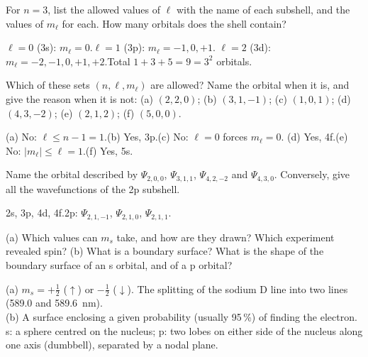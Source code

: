 
For $n = 3$, list the allowed values of $\ell$ with the name of each subshell, and the values of
$m_\ell$ for each. How many orbitals does the shell contain?
\begin{solution}
$\ell = 0$ (3s): $m_\ell = 0$.\quad $\ell = 1$ (3p): $m_\ell = -1, 0, +1$.\quad
$\ell = 2$ (3d): $m_\ell = -2, -1, 0, +1, +2$.\quad Total $1 + 3 + 5 = 9 = 3^2$ orbitals.
\end{solution}

Which of these sets $(n, \ell, m_\ell)$ are allowed? Name the orbital when it is, and give the reason
when it is not: (a) $(2, 2, 0)$; (b) $(3, 1, -1)$; (c) $(1, 0, 1)$; (d) $(4, 3, -2)$;
(e) $(2, 1, 2)$; (f) $(5, 0, 0)$.
\begin{solution}
(a) No: $\ell\le n-1 = 1$.\quad (b) Yes, 3p.\quad (c) No: $\ell = 0$ forces $m_\ell = 0$.\quad
(d) Yes, 4f.\quad (e) No: $|m_\ell|\le\ell = 1$.\quad (f) Yes, 5s.
\end{solution}

Name the orbital described by $\Psi_{2,0,0}$, $\Psi_{3,1,1}$, $\Psi_{4,2,-2}$ and $\Psi_{4,3,0}$.
Conversely, give all the wavefunctions of the 2p subshell.
\begin{solution}
2s, 3p, 4d, 4f.\quad 2p: $\Psi_{2,1,-1}$, $\Psi_{2,1,0}$, $\Psi_{2,1,1}$.
\end{solution}

(a) Which values can $m_s$ take, and how are they drawn? Which experiment revealed spin?
(b) What is a boundary surface? What is the shape of the boundary surface of an s orbital, and of a p
orbital?
\begin{solution}
(a) $m_s = +\frac12$ ($\uparrow$) or $-\frac12$ ($\downarrow$). The splitting of the sodium D line into
two lines (589.0 and 589.6~nm).\\
(b) A surface enclosing a given probability (usually 95\,\%) of finding the electron. s: a sphere
centred on the nucleus; p: two lobes on either side of the nucleus along one axis (dumbbell), separated by
a nodal plane.
\end{solution}

